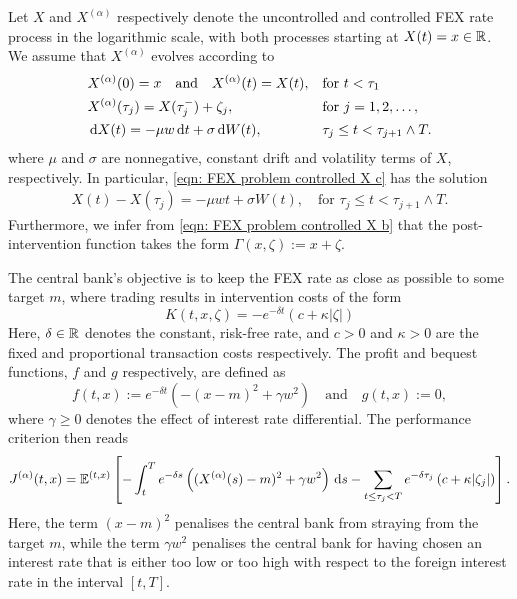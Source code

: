 Let $X$ and $X^{(\alpha)}$ respectively denote the uncontrolled and controlled FEX rate process in the logarithmic scale, with both processes starting at $X(t)=x \in \mathbb{R}$. We assume that $X^{(\alpha)}$ evolves according to
\begin{subequations}
\label{eqn: FEX problem controlled X}
\begin{align}
    & X^{(\alpha)}(0)= x \quad \text{and} \quad X^{(\alpha)}(t)=X(t), && \text{for } t < \tau_1 \label{eqn: FEX problem controlled X a} \\*
    & X^{(\alpha)}(\tau_j) = X(\tau_j^-) + \zeta_j, && \text{for } j = 1, 2, \ldots, \label{eqn: FEX problem controlled X b} \\*
    & \,\mathrm{d} X(t) = -\mu w \,\mathrm{d} t + \sigma \,\mathrm{d} W(t), && \tau_j \leq t < \tau_{j+1} \wedge T.
    \label{eqn: FEX problem controlled X c}
\end{align}
\end{subequations}
where $\mu$ and $\sigma$ are nonnegative, constant drift and volatility terms of $X$, respectively. In particular, \eqref{eqn: FEX problem controlled X c} has the solution
\begin{align}
    X(t) - X(\tau_j) = -\mu w t + \sigma W(t), \quad \text{for } \tau_j \leq t < \tau_{j+1} \wedge T.
    \label{eqn: FEX uncontrolled solution}
\end{align}
Furthermore, we infer from \eqref{eqn: FEX problem controlled X b} that the post-intervention function takes the form $\Gamma(x,\zeta) := x + \zeta$.

The central bank's objective is to keep the FEX rate as close as possible to some target $m$, where trading results in intervention costs of the form
\begin{equation}
    K(t,x,\zeta) = -e^{-\delta t}(c + \kappa |\zeta|) 
    \label{eqn: FEX transaction costs}
\end{equation}
Here, $\delta \in \mathbb{R}$ denotes the constant, risk-free rate, and $c>0$ and $\kappa>0$ are the fixed and proportional transaction costs respectively. The profit and bequest functions, $f$ and $g$ respectively, are defined as
\begin{equation*}
    f(t,x) := e^{-\delta t} \left( -(x-m)^2 + \gamma w^2 \right) \quad \text{and} \quad g(t,x) := 0,
\end{equation*}
where $\gamma\geq 0$ denotes the effect of interest rate differential. The performance criterion then reads
\begin{equation}
    J^{(\alpha)}(t,x) = \mathbb{E}^{(t,x)}\left[ - \int_t^T e^{-\delta s} \left( (X^{(\alpha)}(s) - m)^2 + \gamma w^2 \right) \,\mathrm{d} s - \sum_{t \leq \tau_j < T} e^{-\delta \tau_j} \left( c + \kappa |\zeta_j| \right) \right]. 
    \label{eqn: performance criterion FEX example}
\end{equation}
Here, the term $(x-m)^2$ penalises the central bank from straying from the target $m$, while the term $\gamma w^2$ penalises the central bank for having chosen an interest rate that is either too low or too high with respect to the foreign interest rate in the interval $[t,T]$. 

